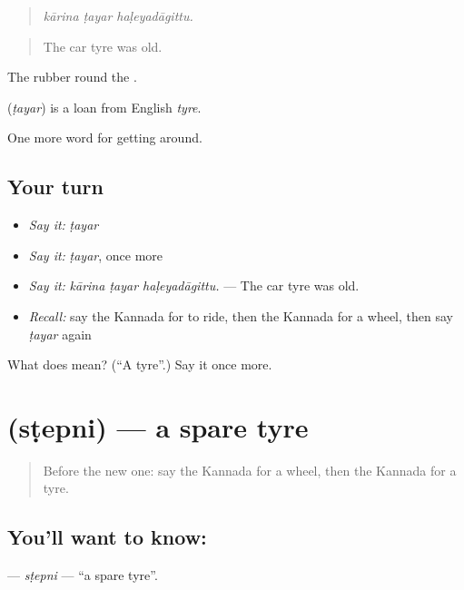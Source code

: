 \begin{quote}
\emph{kārina ṭayar haḷeyadāgittu.}
\end{quote}

\begin{quote}
The car tyre was old.
\end{quote}

The rubber round the .

\begin{cousinweb}
\textbf{} (\emph{ṭayar}) is a loan from English \emph{tyre}.
\end{cousinweb}

\begin{grammarlens}[title={What you've built}]
One more word for getting around.
\end{grammarlens}

\subsection*{Your turn}
\begin{itemize}
\raggedright
  \item \emph{Say it:} \emph{ṭayar}
  \item \emph{Say it:} \emph{ṭayar}, once more
  \item \emph{Say it:} \emph{kārina ṭayar haḷeyadāgittu.} — The car tyre was old.
  \item \emph{Recall:} say the Kannada for to ride, then the Kannada for a wheel, then say \emph{ṭayar} again
\end{itemize}

\begin{tcolorbox}[breakable,colback=teal!4,colframe=teal!35!black,title={Before you move on}]
What does  mean? (\textquotedblleft{}A tyre\textquotedblright{}.) Say it once more.
\end{tcolorbox}
\section[\texorpdfstring{\kn{ಸ್ಟೆಪ್ನಿ} (sṭepni)}{ಸ್ಟೆಪ್ನಿ (sṭepni)}]{ (sṭepni) — a spare tyre}

\label{lesson:KA-C449-stepni}



\begin{quote}
Before the new one: say the Kannada for a wheel, then the Kannada for a tyre.
\end{quote}

\subsection*{You'll want to know: }
\textbf{} — \emph{sṭepni} — \textquotedblleft{}a spare tyre\textquotedblright{}.

